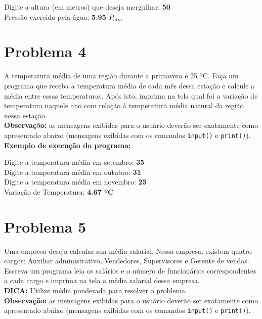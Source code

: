 \documentclass[paper=a4, fontsize=11pt]{scrartcl} %
\numberwithin{equation}{section} %
\numberwithin{figure}{section} %
\numberwithin{table}{section} %
\begin{document}
Digite a altura (em metros) que deseja mergulhar: \textbf{50} \\

Pressão exercida pela água: \textbf{5.95 $P_{atm}$} \\



\section*{Problema 4}

A temperatura média de uma região durante a primavera é 25 ºC. Faça um programa que receba a temperatura média de cada mês dessa estação e calcule a média entre essas temperaturas. Após isto, imprima na tela qual foi a variação de temperatura naquele ano com relação à temperatura média natural da região nessa estação.\\

\textbf{Observação:} as mensagens exibidas para o usuário deverão ser exatamente como apresentado abaixo (mensagens exibidas com os comandos \texttt{input()} e \texttt{print()}).\\

\textbf{Exemplo de execução do programa:}

Digite a temperatura média em setembro: \textbf{35} \\
Digite a temperatura média em outubro: \textbf{31} \\
Digite a temperatura média em novembro: \textbf{23} \\

Variação de Temperatura: \textbf{4.67 ºC}


\section*{Problema 5}

Uma empresa deseja calcular sua média salarial. Nessa empresa, existem quatro cargos: Auxiliar administrativo, Vendedores, Supervisores e Gerente de vendas. Escreva um programa leia os salários e o número de funcionários correspondentes a cada cargo e imprima na tela a média salarial dessa empresa.\\

\textbf{DICA:} Utilize média ponderada para resolver o problema. \\

\textbf{Observação:} as mensagens exibidas para o usuário deverão ser exatamente como apresentado abaixo (mensagens exibidas com os comandos \texttt{input()} e \texttt{print()}).\\
\end{document}
